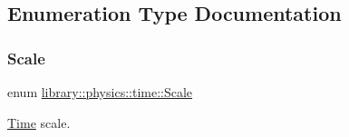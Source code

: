 \subsection{Enumeration Type Documentation}
\mbox{\label{namespacelibrary_1_1physics_1_1time_a09d2bc9fbc7b0b5f92e1419bd655e6bb}} 
\subsubsection{\texorpdfstring{Scale}{Scale}}
{\footnotesize\ttfamily enum \hyperlink{namespacelibrary_1_1physics_1_1time_a09d2bc9fbc7b0b5f92e1419bd655e6bb}{library\+::physics\+::time\+::\+Scale}\hspace{0.3cm}{\ttfamily [strong]}}



\hyperlink{classlibrary_1_1physics_1_1time_1_1_time}{Time} scale. 

